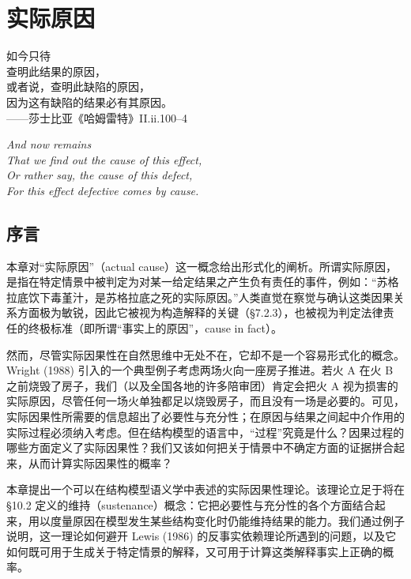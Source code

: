 \chapter{实际原因}

\begin{flushright}
\kaishu\small
如今只待\\
查明此结果的原因，\\
或者说，查明此缺陷的原因，\\
因为这有缺陷的结果必有其原因。\\[2pt]
——莎士比亚《哈姆雷特》II.ii.100--4\\[3pt]
{\itshape
And now remains\\
That we find out the cause of this effect,\\
Or rather say, the cause of this defect,\\
For this effect defective comes by cause.\par}
\end{flushright}

\section*{序言}

本章对“实际原因”（actual cause）这一概念给出形式化的阐析。所谓实际原因，是指在特定情景中被判定为对某一给定结果之产生负有责任的事件，例如：“苏格拉底饮下毒堇汁，是苏格拉底之死的实际原因。”人类直觉在察觉与确认这类因果关系方面极为敏锐，因此它被视为构造解释的关键（\S 7.2.3），也被视为判定法律责任的终极标准（即所谓“事实上的原因”，cause in fact）。

然而，尽管实际因果性在自然思维中无处不在，它却不是一个容易形式化的概念。Wright (1988) 引入的一个典型例子考虑两场火向一座房子推进。若火 A 在火 B 之前烧毁了房子，我们（以及全国各地的许多陪审团）肯定会把火 A 视为损害的实际原因，尽管任何一场火单独都足以烧毁房子，而且没有一场是必要的。可见，实际因果性所需要的信息超出了必要性与充分性；在原因与结果之间起中介作用的实际过程必须纳入考虑。但在结构模型的语言中，“过程”究竟是什么？因果过程的哪些方面定义了实际因果性？我们又该如何把关于情景中不确定方面的证据拼合起来，从而计算实际因果性的概率？

本章提出一个可以在结构模型语义学中表述的实际因果性理论。该理论立足于将在 \S 10.2 定义的维持（sustenance）概念：它把必要性与充分性的各个方面结合起来，用以度量原因在模型发生某些结构变化时仍能维持结果的能力。我们通过例子说明，这一理论如何避开 Lewis (1986) 的反事实依赖理论所遇到的问题，以及它如何既可用于生成关于特定情景的解释，又可用于计算这类解释事实上正确的概率。

